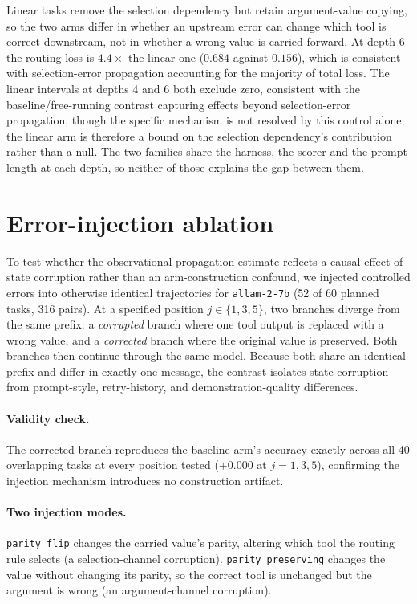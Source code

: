 \documentclass{article}
\begin{document}
Linear tasks remove the selection dependency but retain argument-value copying, so the two
arms differ in whether an upstream error can change which tool is correct downstream, not
in whether a wrong value is carried forward. At depth 6 the routing loss is $4.4\times$ the
linear one ($0.684$ against $0.156$), which is consistent with selection-error propagation
accounting for the majority of total loss. The linear intervals at depths 4 and 6 both
exclude zero, consistent with the baseline/free-running contrast capturing effects
beyond selection-error propagation, though the specific mechanism is not resolved by
this control alone; the linear arm is therefore a bound on the selection dependency's
contribution rather than a null. The two families share the harness, the scorer and the
prompt length at each depth, so neither of those explains the gap between them.

\section{Error-injection ablation}
\label{app:injection}

To test whether the observational propagation estimate reflects a causal effect of state
corruption rather than an arm-construction confound, we injected controlled errors into
otherwise identical trajectories for \texttt{allam-2-7b} (52 of 60 planned tasks, 316
pairs). At a specified position $j\in\{1,3,5\}$, two branches diverge from the same
prefix: a \emph{corrupted} branch where one tool output is replaced with a wrong value,
and a \emph{corrected} branch where the original value is preserved. Both branches then
continue through the same model. Because both share an identical prefix and differ in
exactly one message, the contrast isolates state corruption from prompt-style,
retry-history, and demonstration-quality differences.

\paragraph{Validity check.} The corrected branch reproduces the baseline arm's accuracy
exactly across all 40 overlapping tasks at every position tested ($+0.000$ at $j=1,3,5$),
confirming the injection mechanism introduces no construction artifact.

\paragraph{Two injection modes.} \texttt{parity\_flip} changes the carried value's parity,
altering which tool the routing rule selects (a selection-channel corruption).
\texttt{parity\_preserving} changes the value without changing its parity, so the correct
tool is unchanged but the argument is wrong (an argument-channel corruption).
\end{document}

